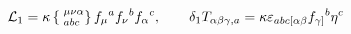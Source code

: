 \begin{equation}
{\cal L}_1 =\kappa \left\{ \phantom{|}^{\mu\nu\alpha}_{abc} \right\}
f_\mu{}^a f_\nu{}^b f_\alpha{}^c, \qquad \delta_1
T_{\alpha\beta\gamma,a} = \kappa
\varepsilon_{abc[\alpha\beta} f_{\gamma]}{}^b \eta^c
\end{equation}

